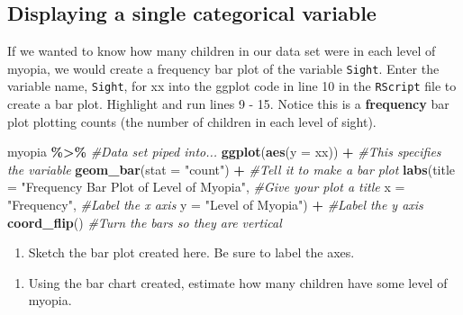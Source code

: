 \documentclass[
]{report}
\newenvironment{Shaded}{\begin{snugshade}}{\end{snugshade}}
\newcommand{\CommentTok}[1]{\textcolor[rgb]{0.56,0.35,0.01}{\textit{#1}}}
\newcommand{\DataTypeTok}[1]{\textcolor[rgb]{0.13,0.29,0.53}{#1}}
\newcommand{\KeywordTok}[1]{\textcolor[rgb]{0.13,0.29,0.53}{\textbf{#1}}}
\newcommand{\NormalTok}[1]{#1}
\newcommand{\OperatorTok}[1]{\textcolor[rgb]{0.81,0.36,0.00}{\textbf{#1}}}
\newcommand{\StringTok}[1]{\textcolor[rgb]{0.31,0.60,0.02}{#1}}
\providecommand{\tightlist}{%
  \setlength{\itemsep}{0pt}\setlength{\parskip}{0pt}}
\begin{document}
\hypertarget{displaying-a-single-categorical-variable}{%
\subsection*{Displaying a single categorical variable}\label{displaying-a-single-categorical-variable}}

If we wanted to know how many children in our data set were in each level of myopia, we would create a frequency bar plot of the variable \texttt{Sight}. Enter the variable name, \texttt{Sight}, for xx into the ggplot code in line 10 in the \texttt{RScript} file to create a bar plot. Highlight and run lines 9 - 15. Notice this is a \textbf{frequency} bar plot plotting counts (the number of children in each level of sight).

\begin{Shaded}
\begin{Highlighting}[]
\NormalTok{myopia }\OperatorTok{\%\textgreater{}\%}\StringTok{ }\CommentTok{\#Data set piped into...}
\KeywordTok{ggplot}\NormalTok{(}\KeywordTok{aes}\NormalTok{(}\DataTypeTok{y =}\NormalTok{ xx)) }\OperatorTok{+}\StringTok{   }\CommentTok{\#This specifies the variable}
\StringTok{  }\KeywordTok{geom\_bar}\NormalTok{(}\DataTypeTok{stat =} \StringTok{"count"}\NormalTok{) }\OperatorTok{+}\StringTok{  }\CommentTok{\#Tell it to make a bar plot}
\StringTok{  }\KeywordTok{labs}\NormalTok{(}\DataTypeTok{title =} \StringTok{"Frequency Bar Plot of Level of Myopia"}\NormalTok{,  }\CommentTok{\#Give your plot a title}
       \DataTypeTok{x =} \StringTok{"Frequency"}\NormalTok{,   }\CommentTok{\#Label the x axis}
       \DataTypeTok{y =} \StringTok{"Level of Myopia"}\NormalTok{)  }\OperatorTok{+}\StringTok{ }\CommentTok{\#Label the y axis}
\StringTok{  }\KeywordTok{coord\_flip}\NormalTok{()  }\CommentTok{\#Turn the bars so they are vertical}
\end{Highlighting}
\end{Shaded}

\newpage

\begin{enumerate}
\def\labelenumi{\arabic{enumi}.}
\tightlist
\item
  Sketch the bar plot created here. Be sure to label the axes.
\end{enumerate}

\vspace{1.5in}

\begin{enumerate}
\def\labelenumi{\arabic{enumi}.}
\setcounter{enumi}{1}
\tightlist
\item
  Using the bar chart created, estimate how many children have some level of myopia.
\end{enumerate}
\end{document}

